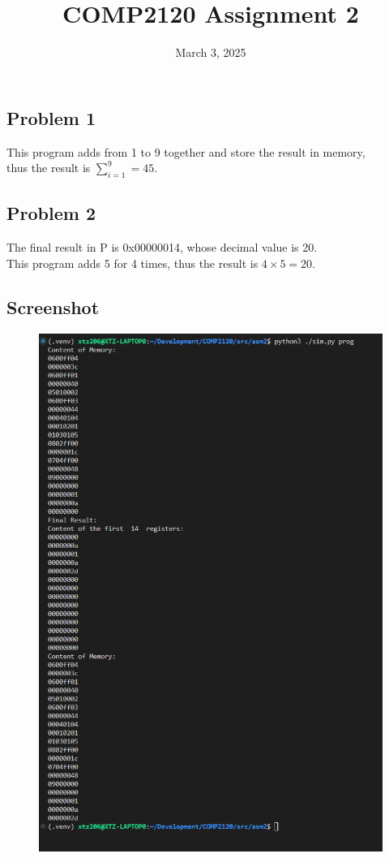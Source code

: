 \documentclass{article}
\title{COMP2120 Assignment 2}
\date{March 3, 2025}
\begin{document}
\maketitle

\subsection*{Problem 1}

This program adds from 1 to 9 together and store the result in memory, \\
thus the result is $\sum_{i=1}^{9} = 45$.

\subsection*{Problem 2}

The final result in P is 0x00000014, whose decimal value is 20. \\
This program adds 5 for 4 times, thus the result is $4 \times 5 = 20$.

\subsection*{Screenshot}
\begin{figure}[htbp]
    \centering
    \includegraphics[height=0.7\textwidth]{../../media/asm2/asm2.png}
\end{figure}
\end{document}
